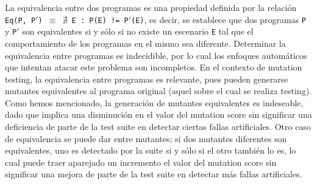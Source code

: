 La equivalencia entre dos programas es una propiedad definida por la relaci\'on \texttt{Eq(P, P$\prime$) $\equiv$ $\nexists$ E : P(E) != P$\prime$(E)}, es decir, se establece que dos programas \texttt{P} y \texttt{P$\prime$} son equivalentes  si y s\'olo si no existe un escenario \texttt{E} tal que el comportamiento de los programas en el mismo sea diferente. Determinar la equivalencia entre programas es indecidible, por lo cual los enfoques autom\'aticos que intentan atacar este problema son incompletos. En el contexto de mutation testing, la equivalencia entre programas es relevante, pues pueden generarse mutantes equivalentes al programa original (aquel sobre el cual se realiza testing). Como hemos mencionado, la generaci\'on de mutantes equivalentes es indeseable, dado que implica una disminuci\'on en el valor del mutation score sin significar una deficiencia de parte de la test suite en detectar ciertas fallas artificiales. Otro caso de equivalencia se puede dar entre mutantes; si dos mutantes diferentes son equivalentes, uno es detectado por la suite si y s\'olo si el otro tambi\'en lo es, lo cual puede traer aparejado un incremento el valor del mutation score sin significar una mejora de parte de la test suite en detectar m\'as fallas artificiales.

